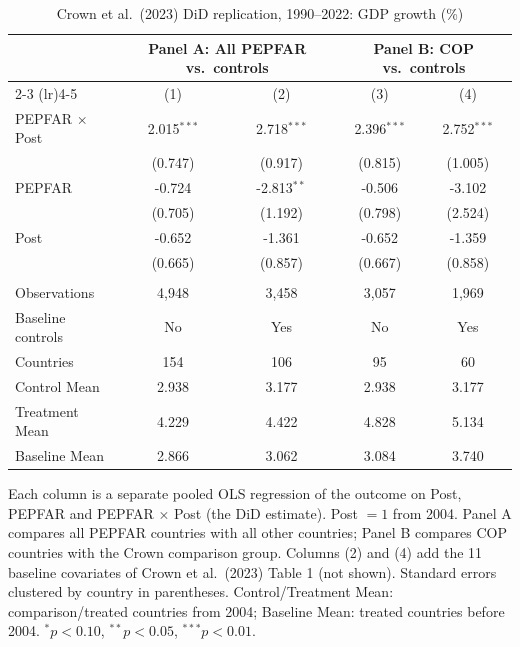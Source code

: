 
\begin{table}[htbp]
   \caption{\label{tab:crown_did_gdp_growth} Crown et al.\ (2023) DiD replication, 1990--2022: GDP growth (\%)}
   \bigskip
   \centering
   \begin{tabular}{lcccc}
      \toprule
       & \multicolumn{2}{c}{Panel A: All PEPFAR vs.\ controls} & \multicolumn{2}{c}{Panel B: COP vs.\ controls} \\ \cmidrule(lr){2-3} \cmidrule(lr){4-5}
                            & (1)           & (2)           & (3)           & (4)\\  
      \midrule 
      PEPFAR $\times$ Post  & 2.015$^{***}$ & 2.718$^{***}$ & 2.396$^{***}$ & 2.752$^{***}$\\   
                            & (0.747)       & (0.917)       & (0.815)       & (1.005)\\   
      PEPFAR                & -0.724        & -2.813$^{**}$ & -0.506        & -3.102\\   
                            & (0.705)       & (1.192)       & (0.798)       & (2.524)\\   
      Post                  & -0.652        & -1.361        & -0.652        & -1.359\\   
                            & (0.665)       & (0.857)       & (0.667)       & (0.858)\\   
       \\
      Observations          & 4,948         & 3,458         & 3,057         & 1,969\\  
      Baseline controls     & No            & Yes           & No            & Yes\\  
      Countries             & 154           & 106           & 95            & 60\\  
      Control Mean          & 2.938         & 3.177         & 2.938         & 3.177\\  
      Treatment Mean        & 4.229         & 4.422         & 4.828         & 5.134\\  
      Baseline Mean         & 2.866         & 3.062         & 3.084         & 3.740\\  
      \bottomrule
   \end{tabular}
   
   \par \raggedright 
   Each column is a separate pooled OLS regression of the outcome on Post, PEPFAR and PEPFAR $\times$ Post (the DiD estimate). Post $= 1$ from 2004. Panel A compares all PEPFAR countries with all other countries; Panel B compares COP countries with the Crown comparison group. Columns (2) and (4) add the 11 baseline covariates of Crown et al.\ (2023) Table 1 (not shown). Standard errors clustered by country in parentheses. Control/Treatment Mean: comparison/treated countries from 2004; Baseline Mean: treated countries before 2004. $^{*}p<0.10$, $^{**}p<0.05$, $^{***}p<0.01$.
\end{table}


